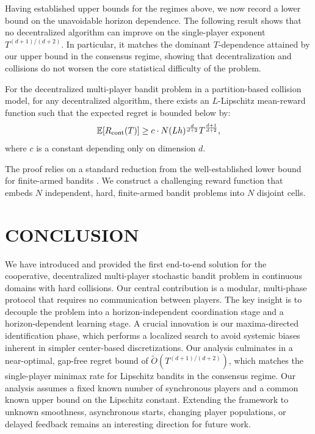 Having established upper bounds for the regimes above, we now record a lower bound on the unavoidable horizon dependence. The following result shows that no decentralized algorithm can improve on the single-player exponent $T^{(d+1)/(d+2)}$. In particular, it matches the dominant $T$-dependence attained by our upper bound in the consensus regime, showing that decentralization and collisions do not worsen the core statistical difficulty of the problem.

\begin{theorem}
\label{thm:lower}
For the decentralized multi-player bandit problem in a partition-based collision model, for any decentralized algorithm, there exists an $L$-Lipschitz mean-reward function such that the expected regret is bounded below by:
\[
\mathbb{E}[R_{\mathrm{cont}}(T)] \ge c \cdot N (Lh)^{\frac{d}{d+2}} T^{\frac{d+1}{d+2}},
\]
where $c$ is a constant depending only on dimension $d$.
\end{theorem}

The proof relies on a standard reduction from the well-established lower bound for finite-armed bandits \citep{lattimore2020bandit,bubeck2012regret}. We construct a challenging reward function that embeds $N$ independent, hard, finite-armed bandit problems into $N$ disjoint cells.










\section{CONCLUSION}
\label{sec:conclusion}
We have introduced and provided the first end-to-end solution for the cooperative, decentralized multi-player stochastic bandit problem in continuous domains with hard collisions. Our central contribution is a modular, multi-phase protocol that requires no communication between players. The key insight is to decouple the problem into a horizon-independent coordination stage and a horizon-dependent learning stage. A crucial innovation is our maxima-directed identification phase, which performs a localized search to avoid systemic biases inherent in simpler center-based discretizations. Our analysis culminates in a near-optimal, gap-free regret bound of $\tilde{O}(T^{(d+1)/(d+2)})$, which matches the single-player minimax rate for Lipschitz bandits in the consensus regime. Our analysis assumes a fixed known number of synchronous players and a common known upper bound on the Lipschitz constant. Extending the framework to unknown smoothness, asynchronous starts, changing player populations, or delayed feedback remains an interesting direction for future work.
